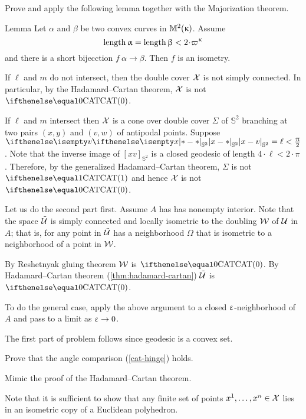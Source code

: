Prove and apply the following lemma together with the Majorization theorem.
\begin{thm}{Lemma}\label{lem:short+convex}
Let $\alpha$ and $\beta$ be two convex curves in $\mathbb{M}_{{}}^{2}({\upkappa})$.
Assume 
\[\length \alpha=\length\beta<2\cdot\varpi\kappa\]
and there is a short bijecction $f\:\alpha\to\beta$.
Then $f$ is an isometry.
\end{thm}



If $\ell$ and $m$ do not intersect, then the double cover $\mathcal{X}$ is not simply connected.
In particular, by the Hadamard--Cartan theorem, $\mathcal{X}$ is not $\CAT0$.

If $\ell$ and $m$ intersect then $\mathcal{X}$ is a cone over double cover $\Sigma$ of $\mathbb{S}^2$ branching at two pairs $(x,y)$ and $(v,w)$ of antipodal points.
Suppose $\dist{x}{v}{\mathbb{S}^2}=\ell<\tfrac\pi2$.
Note that the inverse image of $[xv]_{\mathbb{S}^2}$ is a closed geodesic of length $4\cdot\ell<2\cdot\pi$.
Therefore, by the generalized Hadamard--Cartan theorem, $\Sigma$ is not $\CAT1$ and hence $\mathcal{X}$ is not $\CAT0$.

Let us do the second part first.
Assume $A$ has has nonempty interior. 
Note that the space $\tilde{\mathcal{U}}$ is simply connected and locally isometric to the doubling $\mathcal{W}$ of $\mathcal{U}$ in $A$;
that is, for any point in $\tilde{\mathcal{U}}$ has a neighborhood $\Omega$ that is isometric to a neighborhood of a point in $\mathcal{W}$.

By Reshetnyak gluing theorem $\mathcal{W}$ is $\CAT0$.
By Hadamard--Cartan theorem (\ref{thm:hadamard-cartan}) $\tilde{\mathcal{U}}$ is $\CAT0$.

To do the general case, apply the above argument to a closed $\upvarepsilon$-neighborhood of $A$
and pass to a limit as $\eps\to 0$.

The first part of problem follows since geodesic is a convex set.

 Prove that the angle comparison (\ref{cat-hinge}) holds.

 Mimic the proof of the Hadamard--Cartan theorem.

Note that it is sufficient to show that any finite set of points $x^1,\dots,x^n\in\spc{X}$ lies in an isometric copy of a Euclidean polyhedron.

